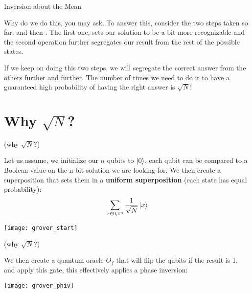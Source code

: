 \documentclass[aspectratio=43]{beamer}
\begin{document}
\begin{frame}{Inversion about the Mean}
    \begin{cardTiny}
        Why do we do this, you may ask. To answer this, consider the two steps taken so far: \phiv and then \iotm. The first one, sets our solution to be a bit more recognizable and the second operation further segregates our result from the rest of the possible states.
    \end{cardTiny}
    \begin{cardTiny}
        If we keep on doing this two steps, we will segregate the correct answer from the others further and further. The number of times we need to do it to have a guaranteed high probability of having the right answer is $\sqrt{N}$!
    \end{cardTiny}
\pagenumber
\end{frame}

\section{Why $\sqrt{N}$?}
\begin{frame}{\gvsa (why $\sqrt{N}$?) }
    \begin{cardTiny}
        Let us assume, we initialize our $n$ qubits to $\ket{0}$, each qubit can be compared to a Boolean value on the n-bit solution we are looking for. We then create a superposition that sets them in a \textbf{uniform superposition} (each state has equal probability):
        \begin{equation*}
            \sum_{x \in {0,1}^n} \frac{1}{\sqrt{N}}\ket{x}
        \end{equation*}
        \begin{center}
            \texttt{[image: grover\_start]}
        \end{center}
    \end{cardTiny}
\pagenumber
\end{frame}


\begin{frame}{\gvsa (why $\sqrt{N}$?)}
    \begin{cardTiny}
        We then create a quantum oracle $O_f$ that will flip the qubits if the result is 1, and apply this gate, this effectively applies a phase inversion:
        \begin{center}
            \texttt{[image: grover\_phiv]}
        \end{center}
    \end{cardTiny}
\pagenumber
\end{frame}
\end{document}
